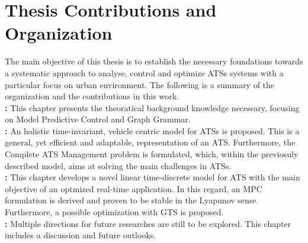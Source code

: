 \section{Thesis Contributions and Organization}
The main objective of this thesis is to establish the necessary foundations towards a systematic approach to analyse, control and optimize ATSs systems with a particular focus on urban environment. The following is a summary of the organization and the contributions in this work. \\
\textbf{: } This chapter presents the theoratical background knowledge necessary, focusing on Model Predictive Control and Graph Grammar. \\
\textbf{: } An holistic time-invariant, vehicle centric model for ATSs is proposed. This is a general, yet efficient and adaptable, representation of an ATS. Furthermore, the Complete ATS Management problem is formulated, which, within the previosuly described model, aims at solving the main challenges in ATSs. \\
\textbf{: } This chapter develops a novel linear time-discrete model for ATS with the main objective of an optmized real-time application. In this regard, an MPC formulation is derived and proven to be stable in the Lyapunov sense. Furthermore, a possible optimization with GTS is proposed. \\
\textbf{: } Multiple directions for future researches are still to be explored. This chapter includes a discussion and future outlooks. 